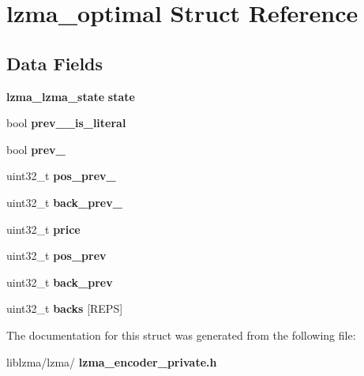 \section{lzma\+\_\+optimal Struct Reference}
\label{structlzma__optimal}
\subsection*{Data Fields}
\begin{DoxyCompactItemize}
\item 
\mbox{\label{structlzma__optimal_a9baf39597fb1eb57774a6b8251c9aa07}} 
\textbf{ lzma\+\_\+lzma\+\_\+state} {\bfseries state}
\item 
\mbox{\label{structlzma__optimal_ac18b37271462f6071a3ce99602a364a1}} 
bool {\bfseries prev\+\_\+\_\+is\+\_\+literal}
\item 
\mbox{\label{structlzma__optimal_a040e18f2c85cb496a410a2b59a6f74a3}} 
bool {\bfseries prev\+\_}
\item 
\mbox{\label{structlzma__optimal_abbb9657f9d85d6d1b8eaba8d452ea9d8}} 
uint32\+\_\+t {\bfseries pos\+\_\+prev\+\_}
\item 
\mbox{\label{structlzma__optimal_a04430741f7d11430ab1e1fa48f78c3d7}} 
uint32\+\_\+t {\bfseries back\+\_\+prev\+\_}
\item 
\mbox{\label{structlzma__optimal_ab42b813078a217af0d5a59fb6fb0f49d}} 
uint32\+\_\+t {\bfseries price}
\item 
\mbox{\label{structlzma__optimal_a007918037a8dabd9b7bdca31f0be7fa2}} 
uint32\+\_\+t {\bfseries pos\+\_\+prev}
\item 
\mbox{\label{structlzma__optimal_a55025d5f894addbfe3c96e0aa05d84bb}} 
uint32\+\_\+t {\bfseries back\+\_\+prev}
\item 
\mbox{\label{structlzma__optimal_a48d0ed5c8c6243fa64aa425c5bc18dac}} 
uint32\+\_\+t {\bfseries backs} [R\+E\+PS]
\end{DoxyCompactItemize}


The documentation for this struct was generated from the following file\+:\begin{DoxyCompactItemize}
\item 
liblzma/lzma/\textbf{ lzma\+\_\+encoder\+\_\+private.\+h}\end{DoxyCompactItemize}
